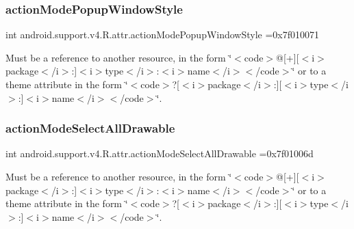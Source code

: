\subsubsection{\texorpdfstring{action\+Mode\+Popup\+Window\+Style}{actionModePopupWindowStyle}}
{\footnotesize\ttfamily int android.\+support.\+v4.\+R.\+attr.\+action\+Mode\+Popup\+Window\+Style =0x7f010071\hspace{0.3cm}{\ttfamily [static]}}

Must be a reference to another resource, in the form \char`\"{}$<$code$>$@\mbox{[}+\mbox{]}\mbox{[}$<$i$>$package$<$/i$>$\+:\mbox{]}$<$i$>$type$<$/i$>$\+:$<$i$>$name$<$/i$>$$<$/code$>$\char`\"{} or to a theme attribute in the form \char`\"{}$<$code$>$?\mbox{[}$<$i$>$package$<$/i$>$\+:\mbox{]}\mbox{[}$<$i$>$type$<$/i$>$\+:\mbox{]}$<$i$>$name$<$/i$>$$<$/code$>$\char`\"{}. \mbox{\label{classandroid_1_1support_1_1v4_1_1R_1_1attr_a2929ce0a70ac3302a375444e27907f6c}} 
\subsubsection{\texorpdfstring{action\+Mode\+Select\+All\+Drawable}{actionModeSelectAllDrawable}}
{\footnotesize\ttfamily int android.\+support.\+v4.\+R.\+attr.\+action\+Mode\+Select\+All\+Drawable =0x7f01006d\hspace{0.3cm}{\ttfamily [static]}}

Must be a reference to another resource, in the form \char`\"{}$<$code$>$@\mbox{[}+\mbox{]}\mbox{[}$<$i$>$package$<$/i$>$\+:\mbox{]}$<$i$>$type$<$/i$>$\+:$<$i$>$name$<$/i$>$$<$/code$>$\char`\"{} or to a theme attribute in the form \char`\"{}$<$code$>$?\mbox{[}$<$i$>$package$<$/i$>$\+:\mbox{]}\mbox{[}$<$i$>$type$<$/i$>$\+:\mbox{]}$<$i$>$name$<$/i$>$$<$/code$>$\char`\"{}. \mbox{\label{classandroid_1_1support_1_1v4_1_1R_1_1attr_ace6b57b0bac24578fdda081a9f2f05b9}} 
